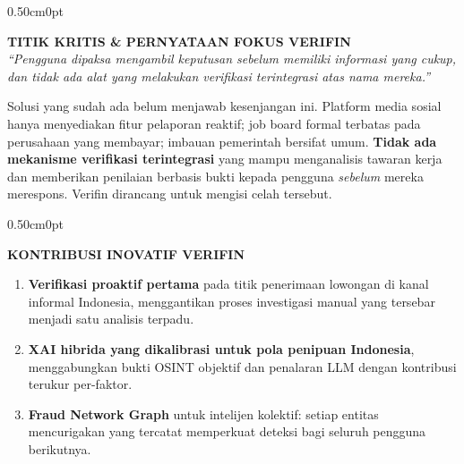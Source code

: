 \documentclass[12pt,a4paper]{article}
\begin{document}
\begin{adjustwidth}{0.50cm}{0pt}
\begin{tcolorbox}[colback=verfinblue!5, colframe=verfinblue!75, boxrule=0.8pt, arc=2mm, left=4mm, right=4mm, top=3mm, bottom=3mm]
\centering\small
\textcolor{verfinblue!90}{\textbf{TITIK KRITIS \& PERNYATAAN FOKUS VERIFIN}} \\[3pt]
\itshape ``Pengguna dipaksa mengambil keputusan sebelum memiliki informasi yang cukup, dan tidak ada alat yang melakukan verifikasi terintegrasi atas nama mereka.''
\end{tcolorbox}
\end{adjustwidth}

Solusi yang sudah ada belum menjawab kesenjangan ini. Platform media sosial hanya menyediakan
fitur pelaporan reaktif; job board formal terbatas pada perusahaan yang membayar; imbauan
pemerintah bersifat umum. \textbf{Tidak ada mekanisme verifikasi terintegrasi} yang mampu
menganalisis tawaran kerja dan memberikan penilaian berbasis bukti kepada pengguna
\textit{sebelum} mereka merespons. Verifin dirancang untuk mengisi celah tersebut.

\begin{adjustwidth}{0.50cm}{0pt}
\begin{tcolorbox}[colback=verfingreen!5, colframe=verfingreen!60, boxrule=0.8pt, arc=2mm, left=4mm, right=4mm, top=3mm, bottom=3mm]
\centering\small
\textcolor{verfingreen!70!black}{\textbf{KONTRIBUSI INOVATIF VERIFIN}} \\[3pt]
\begin{minipage}{\linewidth}
\small
\begin{enumerate}[label=\textbf{\arabic*.}, leftmargin=0.6cm, itemsep=2pt]
\item \textbf{Verifikasi proaktif pertama} pada titik penerimaan lowongan di kanal informal Indonesia, menggantikan proses investigasi manual yang tersebar menjadi satu analisis terpadu.
\item \textbf{XAI hibrida yang dikalibrasi untuk pola penipuan Indonesia}, menggabungkan bukti OSINT objektif dan penalaran LLM dengan kontribusi terukur per-faktor.
\item \textbf{Fraud Network Graph} untuk intelijen kolektif: setiap entitas mencurigakan yang tercatat memperkuat deteksi bagi seluruh pengguna berikutnya.
\end{enumerate}
\end{minipage}
\end{tcolorbox}
\end{adjustwidth}
\end{document}
